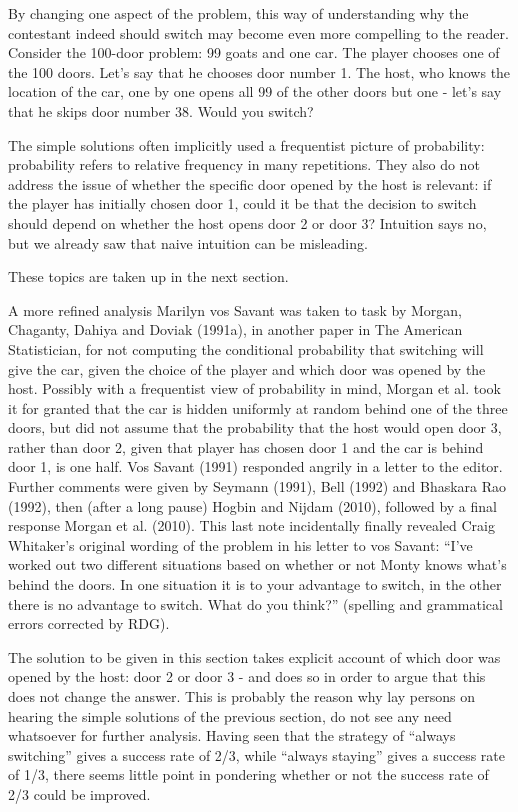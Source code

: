 By changing one aspect of the problem, this way of understanding why the contestant indeed should switch may become even more compelling to the reader. Consider the 100-door problem: 99 goats and one car. The player chooses one of the 100 doors. Let's say that he chooses door number 1. The host, who knows the location of the car, one by one opens all 99 of the other doors but one - let's say that he skips door number 38. Would you switch?

The simple solutions often implicitly used a frequentist picture of probability: probability refers to relative frequency in many repetitions. They also do not address the issue of whether the specific door opened by the host is relevant: if the player has initially chosen door 1, could it be that the decision to switch should depend on whether the host opens door 2 or door 3? Intuition says no, but we already saw that naive intuition can be misleading.

These topics are taken up in the next section.

A more refined analysis
Marilyn vos Savant was taken to task by Morgan, Chaganty, Dahiya and Doviak (1991a), in another paper in The American Statistician, for not computing the conditional probability that switching will give the car, given the choice of the player and which door was opened by the host. Possibly with a frequentist view of probability in mind, Morgan et al. took it for granted that the car is hidden uniformly at random behind one of the three doors, but did not assume that the probability that the host would open door 3, rather than door 2, given that player has chosen door 1 and the car is behind door 1, is one half. Vos Savant (1991) responded angrily in a letter to the editor. Further comments were given by Seymann (1991), Bell (1992) and Bhaskara Rao (1992), then (after a long pause) Hogbin and Nijdam (2010), followed by a final response Morgan et al. (2010). This last note incidentally finally revealed Craig Whitaker's original wording of the problem in his letter to vos Savant: ``I've worked out two different situations based on whether or not Monty knows what's behind the doors. In one situation it is to your advantage to switch, in the other there is no advantage to switch. What do you think?'' (spelling and grammatical errors corrected by RDG).

The solution to be given in this section takes explicit account of which door was opened by the host: door 2 or door 3 - and does so in order to argue that this does not change the answer. This is probably the reason why lay persons on hearing the simple solutions of the previous section, do not see any need whatsoever for further analysis. Having seen that the strategy of ``always switching'' gives a success rate of 2/3, while ``always staying'' gives a success rate of 1/3, there seems little point in pondering whether or not the success rate of 2/3 could be improved.

